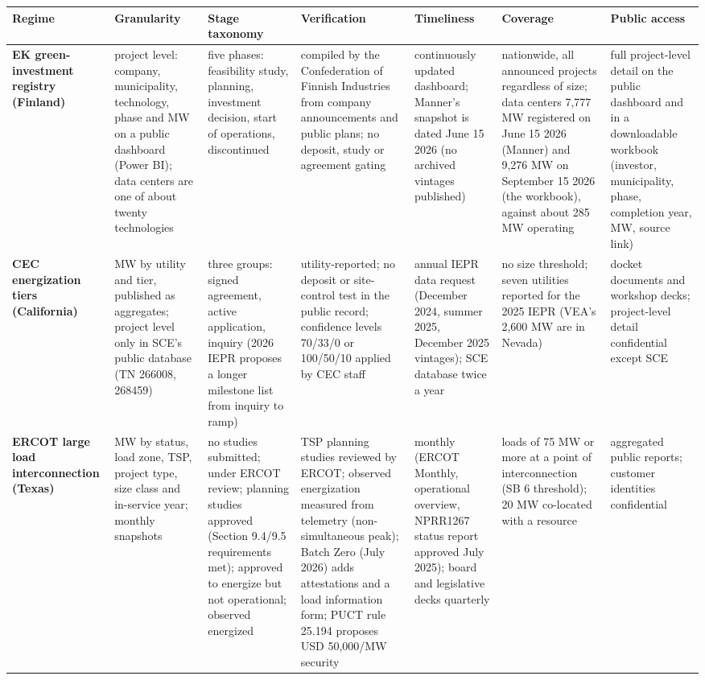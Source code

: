 \begin{tabular}{p{2.4cm}p{3.1cm}p{3.4cm}p{3.6cm}p{2.6cm}p{2.6cm}p{2.6cm}}
\toprule
Regime & Granularity & Stage taxonomy & Verification & Timeliness & Coverage & Public access \\
\midrule
\textbf{EK green-investment registry (Finland)} & project level: company, municipality, technology, phase and MW on a public dashboard (Power BI); data centers are one of about twenty technologies & five phases: feasibility study, planning, investment decision, start of operations, discontinued & compiled by the Confederation of Finnish Industries from company announcements and public plans; no deposit, study or agreement gating & continuously updated dashboard; Manner's snapshot is dated June 15 2026 (no archived vintages published) & nationwide, all announced projects regardless of size; data centers 7,777 MW registered on June 15 2026 (Manner) and 9,276 MW on September 15 2026 (the workbook), against about 285 MW operating & full project-level detail on the public dashboard and in a downloadable workbook (investor, municipality, phase, completion year, MW, source link) \\
\addlinespace
\textbf{CEC energization tiers (California)} & MW by utility and tier, published as aggregates; project level only in SCE's public database (TN 266008, 268459) & three groups: signed agreement, active application, inquiry (2026 IEPR proposes a longer milestone list from inquiry to ramp) & utility-reported; no deposit or site-control test in the public record; confidence levels 70/33/0 or 100/50/10 applied by CEC staff & annual IEPR data request (December 2024, summer 2025, December 2025 vintages); SCE database twice a year & no size threshold; seven utilities reported for the 2025 IEPR (VEA's 2,600 MW are in Nevada) & docket documents and workshop decks; project-level detail confidential except SCE \\
\addlinespace
\textbf{ERCOT large load interconnection (Texas)} & MW by status, load zone, TSP, project type, size class and in-service year; monthly snapshots & no studies submitted; under ERCOT review; planning studies approved (Section 9.4/9.5 requirements met); approved to energize but not operational; observed energized & TSP planning studies reviewed by ERCOT; observed energization measured from telemetry (non-simultaneous peak); Batch Zero (July 2026) adds attestations and a load information form; PUCT rule 25.194 proposes USD 50,000/MW security & monthly (ERCOT Monthly, operational overview, NPRR1267 status report approved July 2025); board and legislative decks quarterly & loads of 75 MW or more at a point of interconnection (SB 6 threshold); 20 MW co-located with a resource & aggregated public reports; customer identities confidential \\

\end{tabular}
